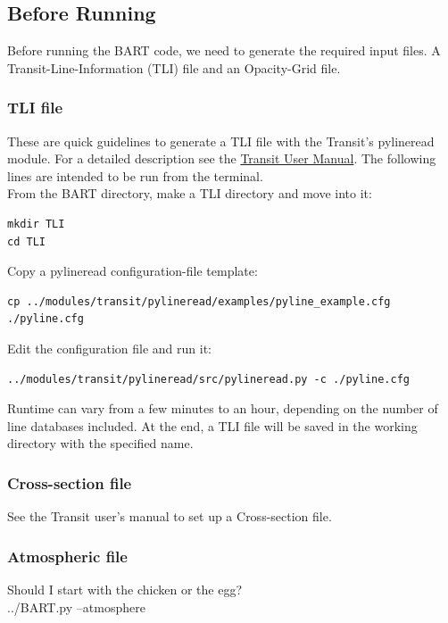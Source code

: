 \documentclass[letterpaper, 12pt]{article}
\begin{document}
\subsection{Before Running}
Before running the BART code, we need to generate the required input
files.  A Transit-Line-Information (TLI) file and an Opacity-Grid
file.

\subsubsection{TLI file}

These are quick guidelines to generate a TLI file with the Transit's
pylineread module.  For a detailed description see the \href{https://exosports.github.io/transit/doc/Transit_User_Manual.html}{Transit User Manual}. The following lines are intended to be run from the terminal. \\

\noindent
From the BART directory, make a TLI directory and move into it:

\begin{verbatim}
mkdir TLI
cd TLI
\end{verbatim}

\noindent
Copy a pylineread configuration-file template: 
\begin{lstlisting}[breaklines]
cp ../modules/transit/pylineread/examples/pyline_example.cfg ./pyline.cfg
\end{lstlisting}

\noindent
Edit the configuration file and run it: 
\begin{verbatim}
../modules/transit/pylineread/src/pylineread.py -c ./pyline.cfg
\end{verbatim}

\noindent
Runtime can vary from a few minutes to an hour, depending on the number of line databases included. At the end, a TLI file will be saved in the working directory with the specified name.

\subsubsection{Cross-section file}
See the Transit user's manual to set up a Cross-section
file.

\subsubsection{Atmospheric file}
Should I start with the chicken or the egg? \newline
{} \\
{\tttb ../BART.py --atmosphere}  \\
\end{document}
